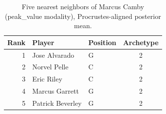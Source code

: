 \begin{table}[htbp]
  \centering\small
  \begin{tabular}{rllc}
    \toprule
    Rank & Player & Position & Archetype \\
    \midrule
    1 & Jose Alvarado & G & 2 \\
    2 & Norvel Pelle & C & 2 \\
    3 & Eric Riley & C & 2 \\
    4 & Marcus Garrett & G & 2 \\
    5 & Patrick Beverley & G & 2 \\
    \bottomrule
  \end{tabular}
  \caption{Five nearest neighbors of Marcus Camby (peak_value modality), Procrustes-aligned posterior mean.}
  \label{tab:Marcus_Camby_neighbors_peak_value}
\end{table}

